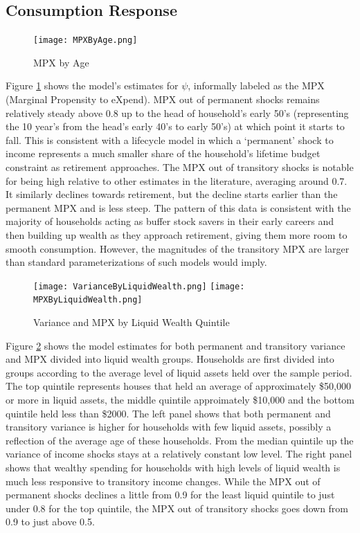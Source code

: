 \documentclass[titlepage]{\econtex}\newcommand{\texname}{IncomeUncertainty}
\begin{document}
\subsection{Consumption Response}
\begin{figure} 
	\begin{centering}
		\texttt{[image: MPXByAge.png]} 
		\caption{MPX by Age}
		\label{fig:MPXByAge}
	\end{centering}
\end{figure}
Figure \ref{fig:MPXByAge} shows the model's estimates for $\psi$, informally labeled as the MPX (Marginal Propensity to eXpend). MPX out of permanent shocks remains relatively steady above 0.8 up to the head of household's early 50's (representing the 10 year's from the head's early 40's to early 50's) at which point it starts to fall. This is consistent with a lifecycle model in which a `permanent' shock to income represents a much smaller share of the household's lifetime budget constraint as retirement approaches. The MPX out of transitory shocks is notable for being high relative to other estimates in the literature, averaging around 0.7. It similarly declines towards retirement, but the decline starts earlier than the permanent MPX and is less steep. The pattern of this data is consistent with the majority of households acting as buffer stock savers in their early careers and then building up wealth as they approach retirement, giving them more room to smooth consumption. However, the magnitudes of the transitory MPX are larger than standard parameterizations of such models would imply.
\begin{figure}
	\centering
	\texttt{[image: VarianceByLiquidWealth.png]}
	\centering
	\texttt{[image: MPXByLiquidWealth.png]}
	\caption{Variance and MPX by Liquid Wealth Quintile}
	\label{fig:MPXByLiquidWealth}
\end{figure}

Figure \ref{fig:MPXByLiquidWealth} shows the model estimates for both permanent and transitory variance and MPX divided into liquid wealth groups. Households are first divided into groups according to the average level of liquid assets held over the sample period. The top quintile represents houses that held an average of approximately \$50,000 or more in liquid assets, the middle quintile approimately \$10,000 and the bottom quintile held less than \$2000. The left panel shows that both permanent and transitory variance is higher for households with few liquid assets, possibly a reflection of the average age of these households. From the median quintile up the variance of income shocks stays at a relatively constant low level. The right panel shows that wealthy spending for households with high levels of liquid wealth is much less responsive to transitory income changes. While the MPX out of permanent shocks declines a little from 0.9 for the least liquid quintile to just under 0.8 for the top quintile, the MPX out of transitory shocks goes down from 0.9 to just above 0.5.
\end{document}

